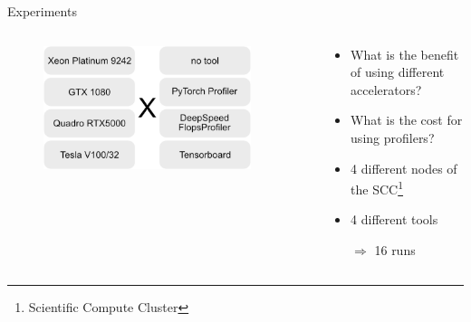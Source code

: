 \documentclass[compress,aspectratio=169]{beamer}
\begin{document}
\begin{frame}{Experiments}
\begin{columns}
        \begin{column}{0.5\textwidth}
            \centering
            \vspace{-1em}
            \begin{figure}
            \includegraphics[width=0.9\textwidth]{../../data/experiments.png}
            \end{figure}
        \end{column}
        \begin{column}{0.5\textwidth}
            \begin{itemize}
                \item What is the benefit of using different accelerators?
                \vspace{1em}
                \item What is the cost for using profilers?
                \vspace{2em}
                \hline
                \vspace{2em}
                \item 4 different nodes of the SCC\footnote{Scientific Compute Cluster}
                \vspace{1em}
                \item 4 different tools
                \vspace{1em}
                \item[$\Rightarrow$] 16 runs
            \end{itemize}
            \vspace{1em}
        \end{column}
    \end{columns}

\end{frame}
\end{document}
